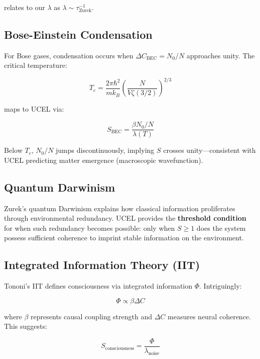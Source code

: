 \documentclass[12pt,a4paper]{article}
\begin{document}
relates to our $\lambda$ as $\lambda \sim \tau_{\text{Zurek}}^{-1}$.

\subsection{Bose-Einstein Condensation}

For Bose gases, condensation occurs when $\Delta C_{\text{BEC}} = N_0/N$ approaches unity. The critical temperature:

\begin{equation}
T_c = \frac{2\pi\hbar^2}{m k_B} \left( \frac{N}{V \zeta(3/2)} \right)^{2/3}
\label{eq:bec_tc}
\end{equation}

maps to UCEL via:

\begin{equation}
S_{\text{BEC}} = \frac{\beta N_0 / N}{\lambda(T)}
\label{eq:bec_s_parameter}
\end{equation}

Below $T_c$, $N_0/N$ jumps discontinuously, implying $S$ crosses unity---consistent with UCEL predicting matter emergence (macroscopic wavefunction).

\subsection{Quantum Darwinism}

Zurek's quantum Darwinism \citep{zurek2009} explains how classical information proliferates through environmental redundancy. UCEL provides the \textbf{threshold condition} for when such redundancy becomes possible: only when $S \geq 1$ does the system possess sufficient coherence to imprint stable information on the environment.

\subsection{Integrated Information Theory (IIT)}

Tononi's IIT \citep{tononi2008} defines consciousness via integrated information $\Phi$. Intriguingly:

\begin{equation}
\Phi \propto \beta \Delta C
\label{eq:phi_ucel}
\end{equation}

where $\beta$ represents causal coupling strength and $\Delta C$ measures neural coherence. This suggests:

\begin{equation}
S_{\text{consciousness}} = \frac{\Phi}{\lambda_{\text{noise}}}
\label{eq:consciousness_s}
\end{equation}
\end{document}
